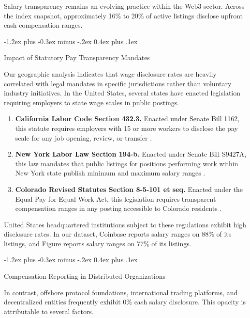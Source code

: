 \documentclass{article}
\makeatletter
\renewcommand\subsection{\@startsection{subsection}{2}{\z@}%
  {-1.2ex plus -0.3ex minus -.2ex}%
  {0.4ex plus .1ex}%
  {\normalsize\bfseries\raggedright}}
\makeatother
\begin{document}
Salary transparency remains an evolving practice within the Web3 sector. Across the index snapshot, approximately 16\% to 20\% of active listings disclose upfront cash compensation ranges.

\subsection{Impact of Statutory Pay Transparency Mandates}

Our geographic analysis indicates that wage disclosure rates are heavily correlated with legal mandates in specific jurisdictions rather than voluntary industry initiatives. In the United States, several states have enacted legislation requiring employers to state wage scales in public postings.

\begin{enumerate}
\item \textbf{California Labor Code Section 432.3.} Enacted under Senate Bill 1162, this statute requires employers with 15 or more workers to disclose the pay scale for any job opening, review, or transfer \cite{ref6}.
\item \textbf{New York Labor Law Section 194-b.} Enacted under Senate Bill S9427A, this law mandates that public listings for positions performing work within New York state publish minimum and maximum salary ranges \cite{ref7}.
\item \textbf{Colorado Revised Statutes Section 8-5-101 et seq.} Enacted under the Equal Pay for Equal Work Act, this legislation requires transparent compensation ranges in any posting accessible to Colorado residents \cite{ref8}.
\end{enumerate}

United States headquartered institutions subject to these regulations exhibit high disclosure rates. In our dataset, Coinbase reports salary ranges on 88\% of its listings, and Figure reports salary ranges on 77\% of its listings.

\subsection{Compensation Reporting in Distributed Organizations}

In contrast, offshore protocol foundations, international trading platforms, and decentralized entities frequently exhibit 0\% cash salary disclosure. This opacity is attributable to several factors.
\end{document}
